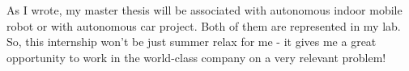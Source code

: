 \documentclass[11pt,a4paper,roman]{moderncv}        %
\begin{document}
\newline
\newline
As I wrote, my master thesis will be associated with autonomous indoor mobile robot or with autonomous car project. Both of them are represented in my lab. So, this internship won't be just summer relax for me - it gives me a great opportunity to work in the world-class company on a very relevant problem! 
\newline


\makeletterclosing
\end{document}

